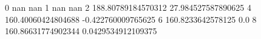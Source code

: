 0 nan nan
1 nan nan
2 188.80789184570312 27.984527587890625
4 160.40060424804688 -0.422760009765625
6 160.8233642578125 0.0
8 160.86631774902344 0.0429534912109375
